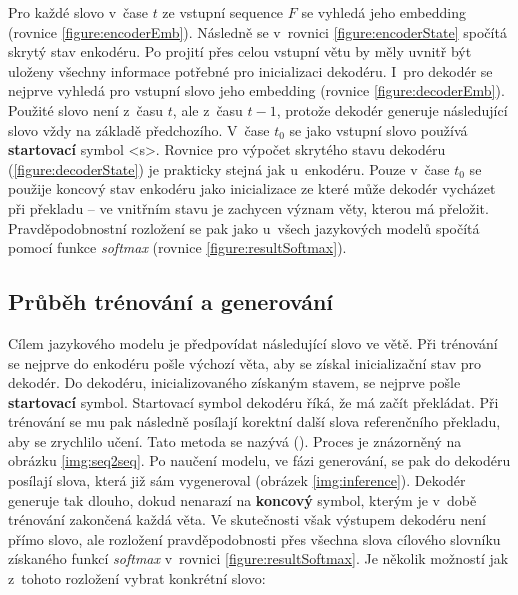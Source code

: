 Pro každé slovo v~čase $t$ ze vstupní sequence $F$ se vyhledá jeho embedding (rovnice \ref{figure:encoderEmb}). Následně se v~rovnici \ref{figure:encoderState} spočítá skrytý stav enkodéru. Po projití přes celou vstupní větu by měly uvnitř být uloženy všechny informace potřebné pro inicializaci dekodéru. I~pro dekodér se nejprve vyhledá pro vstupní slovo jeho embedding (rovnice \ref{figure:decoderEmb}). Použité slovo není z~času $t$, ale z~času $t-1$, protože dekodér generuje následující slovo vždy na základě předchozího. V~čase $t_0$ se jako vstupní slovo používá \textbf{startovací} symbol <s>. Rovnice pro výpočet skrytého stavu dekodéru (\ref{figure:decoderState}) je prakticky stejná jak u~enkodéru. Pouze v~čase $t_0$ se použije koncový stav enkodéru jako inicializace ze které může dekodér vycházet při překladu -- ve vnitřním stavu je zachycen význam věty, kterou má přeložit. Pravděpodobnostní rozložení se pak jako u~všech jazykových modelů spočítá pomocí funkce \emph{softmax} (rovnice \ref{figure:resultSoftmax}).


\subsection{Průběh trénování a generování}

Cílem jazykového modelu je předpovídat následující slovo ve větě. Při trénování se nejprve do enkodéru pošle výchozí věta, aby se získal inicializační stav pro dekodér. Do dekodéru, inicializovaného získaným stavem, se nejprve pošle \textbf{startovací} symbol. Startovací symbol dekodéru říká, že má začít překládat. Při trénování se mu pak následně posílají korektní další slova referenčního překladu, aby se zrychlilo učení. Tato metoda se nazývá \label{teacherForcing} (\cite{teacherForcing}). Proces je znázorněný na obrázku \ref{img:seq2seq}. Po naučení modelu, ve fázi generování, se pak do dekodéru posílají slova, která již sám vygeneroval (obrázek \ref{img:inference}). Dekodér generuje tak dlouho, dokud nenarazí na \textbf{koncový} symbol, kterým je v~době trénování zakončená každá věta. Ve skutečnosti však výstupem dekodéru není přímo slovo, ale rozložení pravděpodobnosti přes všechna slova cílového slovníku získaného funkcí \emph{softmax} v~rovnici \ref{figure:resultSoftmax}. Je několik možností jak z~tohoto rozložení vybrat konkrétní slovo:

